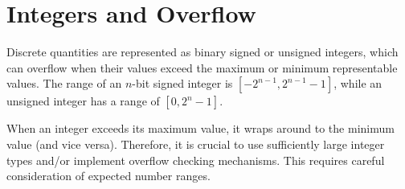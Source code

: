 \section{Integers and Overflow}\label{sec:integer-overflows}

Discrete quantities are represented as binary signed or unsigned integers,
which can overflow when their values exceed the maximum or minimum representable values.
The range of an $n$-bit signed integer is $[-2^{n-1}, 2^{n-1}-1]$,
while an unsigned integer has a range of $[0, 2^n-1]$.

When an integer exceeds its maximum value, it wraps around to the minimum value (and vice versa).
Therefore, it is crucial to use sufficiently large integer types and/or implement overflow checking mechanisms.
This requires careful consideration of expected number ranges.

